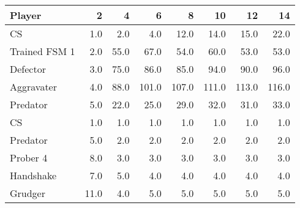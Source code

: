 \begin{tabular}{lrrrrrrr}
\toprule
        Player &     2 &     4 &      6 &      8 &     10 &     12 &     14 \\
\midrule
            CS &   1.0 &   2.0 &    4.0 &   12.0 &   14.0 &   15.0 &   22.0 \\
 Trained FSM 1 &   2.0 &  55.0 &   67.0 &   54.0 &   60.0 &   53.0 &   53.0 \\
      Defector &   3.0 &  75.0 &   86.0 &   85.0 &   94.0 &   90.0 &   96.0 \\
    Aggravater &   4.0 &  88.0 &  101.0 &  107.0 &  111.0 &  113.0 &  116.0 \\
      Predator &   5.0 &  22.0 &   25.0 &   29.0 &   32.0 &   31.0 &   33.0 \\
            CS &   1.0 &   1.0 &    1.0 &    1.0 &    1.0 &    1.0 &    1.0 \\
      Predator &   5.0 &   2.0 &    2.0 &    2.0 &    2.0 &    2.0 &    2.0 \\
      Prober 4 &   8.0 &   3.0 &    3.0 &    3.0 &    3.0 &    3.0 &    3.0 \\
     Handshake &   7.0 &   5.0 &    4.0 &    4.0 &    4.0 &    4.0 &    4.0 \\
       Grudger &  11.0 &   4.0 &    5.0 &    5.0 &    5.0 &    5.0 &    5.0 \\
\bottomrule
\end{tabular}
